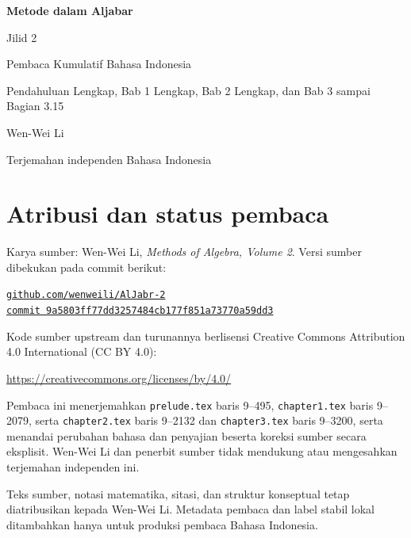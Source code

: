 \documentclass[
  colors=true,
  fontsetup=font-setup-id.tex,
  titlesetup=titles-setup.tex
]{AJbook2}
\theoremstyle{plain}
\theoremstyle{nonumberplain}
\numberwithin{equation}{section}
\numberwithin{figure}{section}
\begin{document}
\begin{titlepage}
  \centering
  \vspace*{0.16\textheight}
  {\Huge\bfseries Metode dalam Aljabar\par}
  \vspace{0.8em}
  {\LARGE Jilid 2\par}
  \vspace{1.8em}
  {\Large Pembaca Kumulatif Bahasa Indonesia\par}
  \vspace{0.6em}
  {\large Pendahuluan Lengkap, Bab 1 Lengkap, Bab 2 Lengkap, dan Bab 3 sampai Bagian 3.15\par}
  \vfill
  {\Large Wen-Wei Li\par}
  \vspace{0.6em}
  {\normalsize Terjemahan independen Bahasa Indonesia\par}
  \vspace*{0.10\textheight}
\end{titlepage}

\cleardoublepage
\thispagestyle{empty}
\section*{Atribusi dan status pembaca}
Karya sumber: Wen-Wei Li, \emph{Methods of Algebra, Volume 2}. Versi
sumber dibekukan pada commit berikut:
\begin{center}
  \small
  \href{https://github.com/wenweili/AlJabr-2}{\texttt{github.com/wenweili/AlJabr-2}}\\
  \href{https://github.com/wenweili/AlJabr-2/commit/9a5803ff77dd3257484cb177f851a73770a59dd3}{\texttt{commit 9a5803ff77dd3257484cb177f851a73770a59dd3}}
\end{center}
Kode sumber upstream dan turunannya berlisensi Creative Commons
Attribution 4.0 International (CC BY 4.0):
\begin{center}
  \small\url{https://creativecommons.org/licenses/by/4.0/}
\end{center}
Pembaca ini menerjemahkan
\texttt{prelude.tex} baris 9--495, \texttt{chapter1.tex} baris 9--2079,
serta \texttt{chapter2.tex} baris 9--2132 dan \texttt{chapter3.tex} baris
9--3200, serta menandai perubahan bahasa dan penyajian beserta koreksi sumber
secara eksplisit. Wen-Wei Li dan penerbit sumber tidak mendukung atau
mengesahkan terjemahan independen ini.

\medskip
Teks sumber, notasi matematika, sitasi, dan struktur konseptual tetap
diatribusikan kepada Wen-Wei Li. Metadata pembaca dan label stabil lokal
ditambahkan hanya untuk produksi pembaca Bahasa Indonesia.
\end{document}
